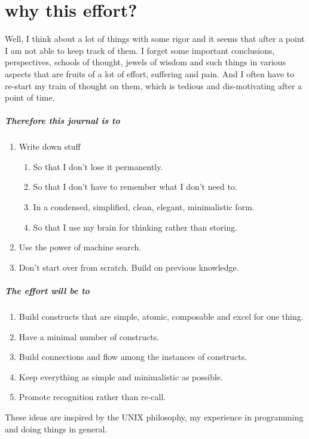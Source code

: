 \documentclass[./main.tex]{subfiles}
\begin{document}
\chapter*{why this effort?}

Well, I think about a lot of things with some rigor and it seems that after a point I am not able to keep track of them.
I forget some important conclusions, perspectives, schools of thought, jewels of wisdom and such things in various aspects that are fruits of a lot of effort, suffering and pain.
And I often have to re-start my train of thought on them, which is tedious and dis-motivating after a point of time.

\paragraph{Therefore this journal is to}

\begin{enumerate}
  \item Write down stuff
    \begin{enumerate}
      \item So that I don't lose it permanently.
      \item So that I don't have to remember what I don't need to.
      \item In a condensed, simplified, clean, elegant, minimalistic form.
      \item So that I use my brain for thinking rather than storing.
    \end{enumerate}
  \item Use the power of machine search.
  \item Don't start over from scratch. Build on previous knowledge.
\end{enumerate}

\begin{figure}[h]
  \centering
\end{figure}

\paragraph{The effort will be to}
\begin{enumerate}
  \item Build constructs that are simple, atomic, composable and excel for one thing.
  \item Have a minimal number of constructs.
  \item Build connections and flow among the instances of constructs.
  \item Keep everything as simple and minimalistic as possible.
  \item Promote recognition rather than re-call.
\end{enumerate}
These ideas are inspired by the UNIX philosophy, my experience in programming and doing things in general.
\end{document}

